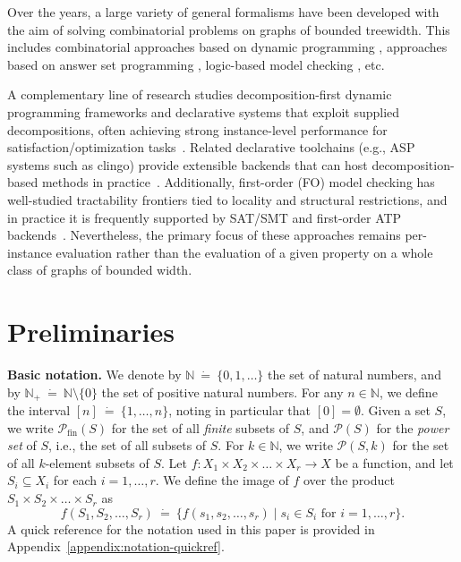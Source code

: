 \documentclass[11pt,a4paper]{article}
\newcommand{\Nplus}{\mathbb{N}_{+}}
\newcommand{\N}{\mathbb{N}}
\newcommand{\defeq}{~\dot{=}~}
\newcommand{\finitepowerset}[1]{\mathcal{P}_{\mathrm{fin}}(#1)}
\newcommand{\powerset}[1]{\mathcal{P}(#1)}
\newcommand{\powersetchoosek}[2]{\mathcal{P}(#1,#2)}
\begin{document}
Over the years, a large variety of general formalisms have been developed with the aim of solving combinatorial problems on graphs of bounded treewidth. This includes combinatorial approaches based on dynamic programming \cite{bodlaender1988dynamic,bodlaender2008combinatorial}, approaches based on answer set programming \cite{fichte2017answer}, logic-based model checking \cite{courcelle1990monadic,seese1991structure,courcelle2012automata}, etc.


A complementary line of research studies decomposition-first dynamic programming frameworks and declarative systems
that exploit supplied decompositions, often achieving strong instance-level performance for
satisfaction/optimization tasks~\cite{fichte2017answer,bannach2023structure}. Related declarative toolchains
(e.g., ASP systems such as clingo) provide extensible backends that can host decomposition-based methods
in practice~\cite{gebser2016theory}.
Additionally, first-order (FO) model checking has well-studied tractability frontiers tied to locality and structural restrictions, and in practice it is frequently supported by SAT/SMT and first-order ATP backends~\cite{de2008z3,barrett2011cvc4,kovacs2013first,weidenbach2009spass}.
Nevertheless, the primary focus of these approaches remains per-instance evaluation rather than the evaluation of a given property on a whole class of graphs of bounded width.

\section{Preliminaries}
\label{section:Preliminaries}

\par\medskip\noindent\textbf{Basic notation.}
We denote by $\N \defeq \{0,1,\dots\}$ the set of natural numbers, and by $\Nplus \defeq \N \setminus \{0\}$ the set of positive natural numbers.
For any $n \in \N$, we define the interval $[n] \defeq \{1,\dots,n\}$, noting in particular that $[0] = \emptyset$.
Given a set $S$, we write $\finitepowerset{S}$ for the set of all \emph{finite} subsets of $S$, and $\powerset{S}$ for the \emph{power set} of $S$, i.e., the set of all subsets of $S$.
For $k\in\N$, we write $\powersetchoosek{S}{k}$ for the set of all $k$-element subsets of $S$.
Let $f : X_1 \times X_2 \times \dots \times X_r \rightarrow X$ be a function, and let $S_i \subseteq X_i$ for each $i = 1,\dots,r$. We define the image of $f$ over the product $S_1 \times S_2 \times \dots \times S_r$ as
\[
f(S_1, S_2, \dots, S_r) \defeq \{f(s_1, s_2, \dots, s_r) \mid s_i \in S_i \text{ for } i = 1,\dots,r\}.
\]
A quick reference for the notation used in this paper is provided in Appendix~\ref{appendix:notation-quickref}.
\end{document}
